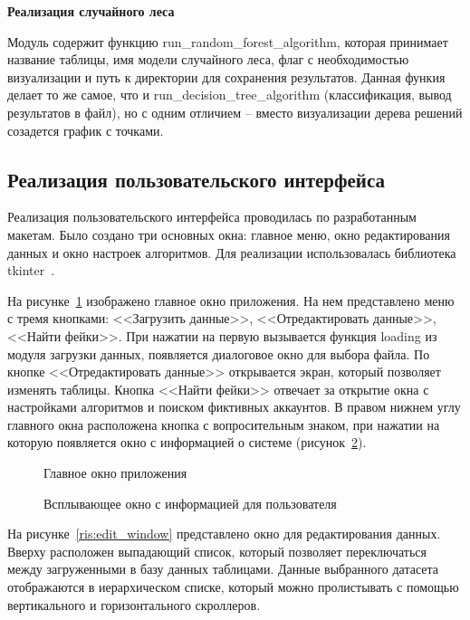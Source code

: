 \textbf{Реализация случайного леса}

Модуль содержит функцию run\_random\_forest\_algorithm, которая принимает название таблицы, имя модели случайного леса, флаг с необходимостью визуализации и путь к директории для сохранения результатов. Данная функия делает то же самое, что и run\_decision\_tree\_algorithm (классификация, вывод результатов в файл), но с одним отличием -- вместо визуализации дерева решений созадется график с точками.


\vspace{1.5em}
\subsection{Реализация пользовательского интерфейса}
\label{subsec:UserInt}
Реализация пользовательского интерфейса проводилась по разработанным макетам. Было создано три основных окна: главное меню, окно редактирования данных и окно настроек алгоритмов. Для реализации использовалась библиотека tkinter~\cite{tkinter}.

На рисунке~\ref{ris:main_window} изображено главное окно приложения. На нем представлено меню с тремя кнопками: <<Загрузить данные>>, <<Отредактировать данные>>, <<Найти фейки>>. При нажатии на первую вызывается функция loading из модуля загрузки данных, появляется диалоговое окно для выбора файла. По кнопке <<Отредактировать данные>> открывается экран, который позволяет изменять таблицы. Кнопка <<Найти фейки>> отвечает за открытие окна с настройками алгоритмов и поиском фиктивных аккаунтов. В правом нижнем углу главного окна расположена кнопка с вопросительным знаком, при нажатии на которую появляется окно с информацией о системе (рисунок~\ref{ris:help}).


\begin{figure}[h!]
    \caption{Главное окно приложения}
    \label{ris:main_window}
\end{figure}


\begin{figure}[H]
    \caption{Всплывающее окно с информацией для пользователя}
    \label{ris:help}
\end{figure}


На рисунке~\ref{ris:edit_window} представлено окно для редактирования данных. Вверху расположен выпадающий список, который позволяет переключаться между загруженными в базу данных таблицами. Данные выбранного датасета отображаются в иерархическом списке, который можно пролистывать с помощью вертикального и горизонтального скроллеров. 

